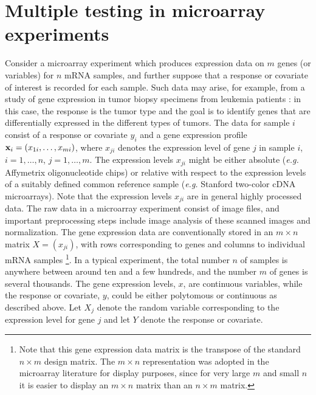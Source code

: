 \documentclass[11pt]{article}
\begin{document}
\section{Multiple testing in microarray experiments}

Consider a microarray experiment which produces expression data on $m$
genes (or variables) for $n$ mRNA samples, and further suppose that a response or covariate of interest is recorded for each sample. Such data may arise, for example, from a study of gene expression in tumor biopsy specimens from leukemia patients \citep{Golubetal}: in this case, the response is the tumor type and the goal is to identify genes that are differentially expressed in the different types of tumors. The data for sample $i$ consist of a response or covariate $y_i$ and a gene expression profile ${\bf x}_i = (x_{1i}, \ldots, x_{mi})$, where $x_{ji}$ denotes the expression level of gene $j$ in sample $i$, $i=1, \ldots, n$, $j=1, \ldots, m$. The expression levels $x_{ji}$ might be either absolute ({\it e.g.} Affymetrix oligonucleotide chips) or relative with
respect to the expression levels of a suitably defined common reference sample
({\it e.g.} Stanford two-color cDNA microarrays). Note that the expression levels $x_{ji}$ are in general highly processed data. The raw data in a microarray experiment consist of image files, and important preprocessing steps include image analysis of these scanned images and normalization. The gene expression data are conventionally stored in an $m \times n$ matrix $X = (x_{ji})$, with rows corresponding to genes and columns to individual mRNA samples \footnote{Note that this gene expression data matrix is the transpose of the standard $n \times m$ design matrix. The $m \times n$ representation was adopted in the microarray literature for display purposes, since for very large $m$ and small $n$ it is easier to display an $m \times n$ matrix than an $n \times m$ matrix.}. In a typical experiment, the total number $n$ of samples is anywhere between around ten and a few hundreds, and the number $m$ of genes is several thousands. The gene expression levels, $x$, are continuous variables, while the response or covariate, $y$, could be either polytomous or continuous as described above. Let $X_j$ denote the random variable corresponding to the expression level for gene $j$ and let $Y$ denote the response or covariate.  \\
\end{document}
